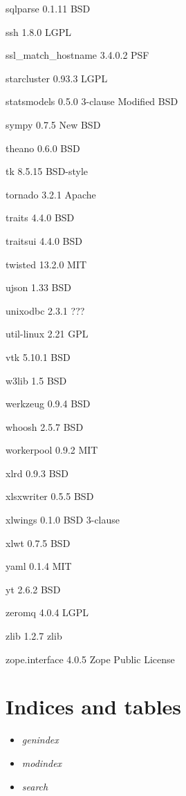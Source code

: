 \documentclass[letterpaper,10pt,openany,oneside]{sphinxmanual}
\begin{document}
\begin{DUlineblock}{0em}
\item[] sqlparse      0.1.11  BSD
\item[] ssh   1.8.0   LGPL
\item[] ssl\_match\_hostname    3.4.0.2         PSF
\item[] starcluster   0.93.3  LGPL
\item[] statsmodels   0.5.0   3-clause Modified BSD
\item[] sympy         0.7.5   New BSD
\item[] theano        0.6.0   BSD
\item[] tk    8.5.15  BSD-style
\item[] tornado       3.2.1   Apache
\item[] traits        4.4.0   BSD
\item[] traitsui      4.4.0   BSD
\item[] twisted       13.2.0  MIT
\item[] ujson         1.33    BSD
\item[] unixodbc      2.3.1   ???
\item[] util-linux    2.21    GPL
\item[] vtk   5.10.1  BSD
\item[] w3lib         1.5     BSD
\item[] werkzeug      0.9.4   BSD
\item[] whoosh        2.5.7   BSD
\item[] workerpool    0.9.2   MIT
\item[] xlrd  0.9.3   BSD
\item[] xlsxwriter    0.5.5   BSD
\item[] xlwings       0.1.0   BSD 3-clause
\item[] xlwt  0.7.5   BSD
\item[] yaml  0.1.4   MIT
\item[] yt    2.6.2   BSD
\item[] zeromq        4.0.4   LGPL
\item[] zlib  1.2.7   zlib
\item[] zope.interface        4.0.5   Zope Public License
\end{DUlineblock}


\chapter{Indices and tables}
\label{index:indices-and-tables}\begin{itemize}
\item {} 
\emph{genindex}

\item {} 
\emph{modindex}

\item {} 
\emph{search}

\end{itemize}
\end{document}
